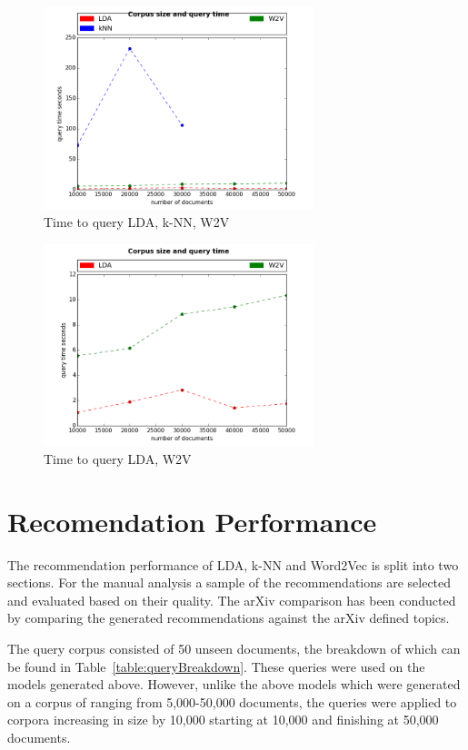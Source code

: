 \begin{figure}[h]
    \centering
        \includegraphics[width=0.7\textwidth]{Figures/queryAll.png}
    \caption{Time to query LDA, k-NN, W2V}
    \label{fig:queryAll}
\end{figure}

\begin{figure}[h]
    \centering
        \includegraphics[width=0.7\textwidth]{Figures/queryLDAKNN.png}
    \caption{Time to query LDA, W2V}
    \label{fig:queryLDAKNN}
\end{figure}

\section{Recomendation Performance}
The recommendation performance of LDA, k-NN and Word2Vec is split into two sections.
For the manual analysis a sample of the recommendations are selected and evaluated based on their quality.
The arXiv comparison has been conducted by comparing the generated recommendations against the arXiv defined topics.

The query corpus consisted of 50 unseen documents, the breakdown of which can be found in Table~\ref{table:queryBreakdown}.
These queries were used on the models generated above.
However, unlike the above models which were generated on a corpus of ranging from 5,000-50,000 documents, the queries were applied to corpora increasing in size by 10,000 starting at 10,000 and finishing at 50,000 documents.

